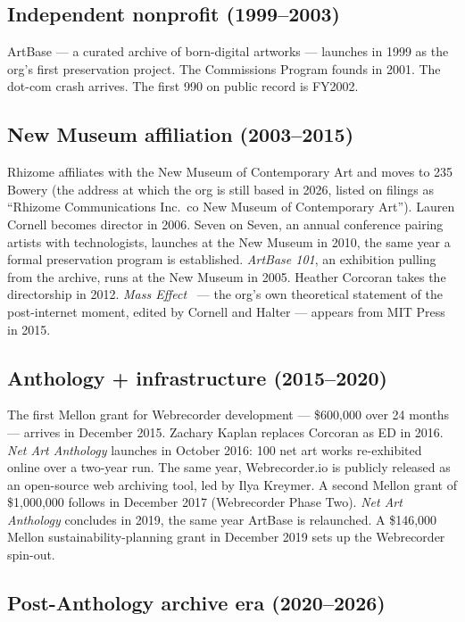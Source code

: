 \documentclass[10pt,letterpaper,twocolumn]{article}
\begin{document}
\subsection{Independent nonprofit (1999--2003)}

ArtBase --- a curated archive of born-digital artworks --- launches in 1999 as the org's first preservation project. The Commissions Program founds in 2001. The dot-com crash arrives. The first 990 on public record is FY2002.

\subsection{New Museum affiliation (2003--2015)}

Rhizome affiliates with the New Museum of Contemporary Art and moves to 235 Bowery (the address at which the org is still based in 2026, listed on filings as ``Rhizome Communications Inc.~co New Museum of Contemporary Art''). Lauren Cornell becomes director in 2006. Seven on Seven, an annual conference pairing artists with technologists, launches at the New Museum in 2010, the same year a formal preservation program is established. \emph{ArtBase 101}, an exhibition pulling from the archive, runs at the New Museum in 2005. Heather Corcoran takes the directorship in 2012. \emph{Mass Effect}~\citep{cornell2015mass} --- the org's own theoretical statement of the post-internet moment, edited by Cornell and Halter --- appears from MIT Press in 2015.

\subsection{Anthology + infrastructure (2015--2020)}

The first Mellon grant for Webrecorder development --- \$600,000 over 24 months --- arrives in December 2015. Zachary Kaplan replaces Corcoran as ED in 2016. \emph{Net Art Anthology} launches in October 2016: 100 net art works re-exhibited online over a two-year run. The same year, Webrecorder.io is publicly released as an open-source web archiving tool, led by Ilya Kreymer. A second Mellon grant of \$1,000,000 follows in December 2017 (Webrecorder Phase Two). \emph{Net Art Anthology} concludes in 2019, the same year ArtBase is relaunched. A \$146,000 Mellon sustainability-planning grant in December 2019 sets up the Webrecorder spin-out.

\subsection{Post-Anthology archive era (2020--2026)}
\end{document}
